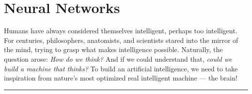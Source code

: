 \chapter{Neural Networks}

Humans have always considered themselves intelligent, perhaps too intelligent. For centuries, philosophers, anatomists, and scientists stared into the mirror of the mind, trying to grasp what makes intelligence possible. Naturally, the question arose: \textit{How do we think?} And if we could understand that, \textit{could we build a machine that thinks?} To build an artificial intelligence, we need to take inspiration from nature's most optimized real intelligent machine — the brain!






\vspace{30pt}
\hrule

